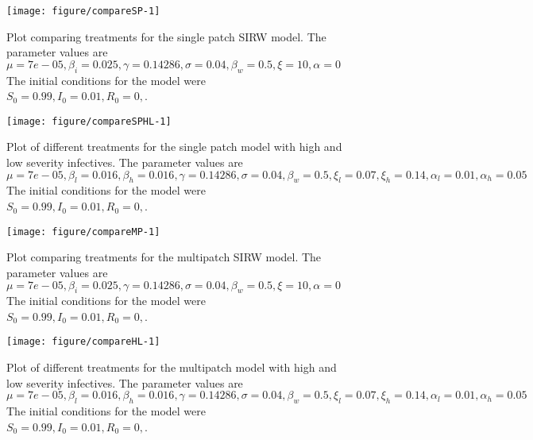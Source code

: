 \documentclass[12pt]{article}\usepackage[]{graphicx}\usepackage[]{color}
\makeatletter
\def\maxwidth{ %
  \ifdim\Gin@nat@width>\linewidth
    \linewidth
  \else
    \Gin@nat@width
  \fi
}
\newenvironment{knitrout}{}{} %
\makeatother
\begin{document}
\begin{knitrout}
\color{fgcolor}\begin{figure}
\texttt{[image: figure/compareSP-1]} \caption{\label{fig:multitreatment} Plot comparing treatments for the single patch SIRW model. The parameter values are $\mu=7e-05,\beta_i=0.025,\gamma=0.14286,\sigma=0.04,\beta_w=0.5,\xi=10,\alpha=0$ The initial conditions for the model were $S_0=0.99,I_0=0.01,R_0=0,$.}\label{fig:compareSP}
\end{figure}


\end{knitrout}
\FloatBarrier
\begin{knitrout}
\color{fgcolor}\begin{figure}
\texttt{[image: figure/compareSPHL-1]} \caption{\label{fig:multipatch} Plot of different treatments for the single patch model with high and low severity infectives. The parameter values are $\mu=7e-05,\beta_l=0.016,\beta_h=0.016,\gamma=0.14286,\sigma=0.04,\beta_w=0.5,\xi_l=0.07,\xi_h=0.14,\alpha_l=0.01,\alpha_h=0.05$ The initial conditions for the model were $S_0=0.99,I_0=0.01,R_0=0,$.}\label{fig:compareSPHL}
\end{figure}


\end{knitrout}
\FloatBarrier
\begin{knitrout}
\color{fgcolor}\begin{figure}
\texttt{[image: figure/compareMP-1]} \caption{\label{fig:multitreatment} Plot comparing treatments for the multipatch SIRW model. The parameter values are $\mu=7e-05,\beta_i=0.025,\gamma=0.14286,\sigma=0.04,\beta_w=0.5,\xi=10,\alpha=0$ The initial conditions for the model were $S_0=0.99,I_0=0.01,R_0=0,$.}\label{fig:compareMP}
\end{figure}


\end{knitrout}
\FloatBarrier
\begin{knitrout}
\color{fgcolor}\begin{figure}
\texttt{[image: figure/compareHL-1]} \caption{\label{fig:multipatch} Plot of different treatments for the multipatch model with high and low severity infectives. The parameter values are $\mu=7e-05,\beta_l=0.016,\beta_h=0.016,\gamma=0.14286,\sigma=0.04,\beta_w=0.5,\xi_l=0.07,\xi_h=0.14,\alpha_l=0.01,\alpha_h=0.05$ The initial conditions for the model were $S_0=0.99,I_0=0.01,R_0=0,$.}\label{fig:compareHL}
\end{figure}


\end{knitrout}
\FloatBarrier
\end{document}
